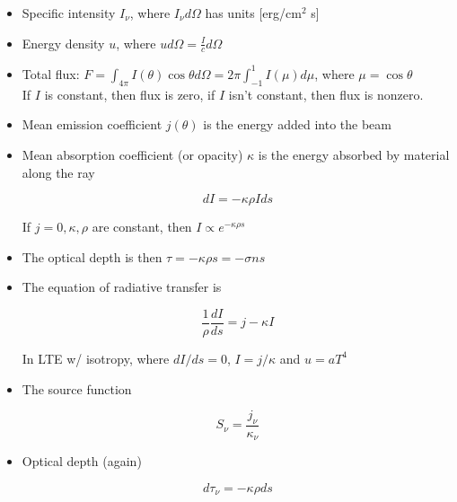 \documentclass{article}
\begin{document}
\begin{itemize}
    \item Specific intensity $I_\nu$, where $I_\nu d\Omega$ has units [erg/cm$^2$ s]

    \item Energy density $u$, where $ud\Omega = \frac{I}{c}d\Omega$

    \item Total flux: $F = \int_{4\pi}I(\theta)\cos{\theta}d\Omega = 2\pi \int_{-1}^{1}I(\mu)d\mu$, where $\mu = \cos{\theta}$\\

    If $I$ is constant, then flux is zero, if $I$ isn't constant, then flux is nonzero.

    \item Mean emission coefficient $j(\theta)$ is the energy added into the beam

    \item Mean absorption coefficient (or opacity) $\kappa$ is the energy absorbed by material along the ray

    \begin{equation}
        dI = -\kappa\rho Ids
    \end{equation}

    If $j = 0, \kappa, \rho$ are constant, then $I \propto e^{-\kappa\rho s}$

    \item The optical depth is then $\tau = -\kappa\rho s = -\sigma n s$

    \item The equation of radiative transfer is 

    \begin{equation}
        \frac{1}{\rho}\frac{dI}{ds} = j - \kappa I
    \end{equation}

    In LTE w/ isotropy, where $dI/ds = 0$, $I = j/\kappa$ and $u = aT^4$

    \item The source function 

    \begin{equation}
        S_\nu = \frac{j_{\nu}}{\kappa_{\nu}}
    \end{equation}

    \item Optical depth (again)

    \begin{equation}
        d\tau_\nu = -\kappa\rho ds
    \end{equation}


\end{itemize}
\end{document}
